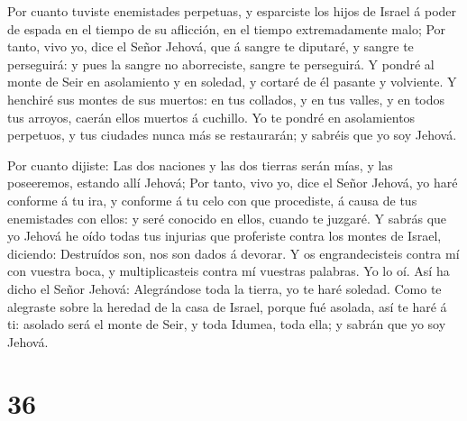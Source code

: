  Por cuanto tuviste enemistades perpetuas, y esparciste los
hijos de Israel á poder de espada en el tiempo de su aflicción, en el
tiempo extremadamente malo;  Por tanto, vivo yo, dice el
Señor Jehová, que á sangre te diputaré, y sangre te perseguirá: y pues
la sangre no aborreciste, sangre te perseguirá.  Y pondré al
monte de Seir en asolamiento y en soledad, y cortaré de él pasante y
volviente.  Y henchiré sus montes de sus muertos: en tus
collados, y en tus valles, y en todos tus arroyos, caerán ellos muertos
á cuchillo.  Yo te pondré en asolamientos perpetuos, y tus
ciudades nunca más se restaurarán; y sabréis que yo soy Jehová.

 Por cuanto dijiste: Las dos naciones y las dos tierras
serán mías, y las poseeremos, estando allí Jehová;  Por
tanto, vivo yo, dice el Señor Jehová, yo haré conforme á tu ira, y
conforme á tu celo con que procediste, á causa de tus enemistades con
ellos: y seré conocido en ellos, cuando te juzgaré.  Y
sabrás que yo Jehová he oído todas tus injurias que proferiste contra
los montes de Israel, diciendo: Destruídos son, nos son dados á devorar.
 Y os engrandecisteis contra mí con vuestra boca, y
multiplicasteis contra mí vuestras palabras. Yo lo oí.  Así
ha dicho el Señor Jehová: Alegrándose toda la tierra, yo te haré
soledad.  Como te alegraste sobre la heredad de la casa de
Israel, porque fué asolada, así te haré á ti: asolado será el monte de
Seir, y toda Idumea, toda ella; y sabrán que yo soy Jehová.

\hypertarget{section-35}{%
\section{36}\label{section-35}}

